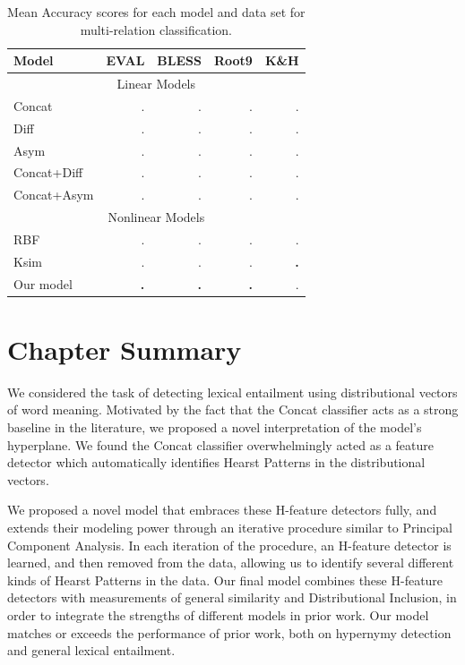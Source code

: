 \begin{table}
\centering
\begin{tabular}{|l|rrrr|}
  \hline
  {\bf Model}      & {\bf EVAL}  & {\bf BLESS} & {\bf Root9} & {\bf K\&H}  \\
  \hline
  \hline
  \multicolumn{5}{|c|}{Linear Models}\\
  \hline
  Concat           &      .      &      .      &      .        &      .      \\
  Diff             &      .      &      .      &      .        &      .      \\
  Asym             &      .      &      .      &      .        &      .      \\
  Concat+Diff      &      .      &      .      &      .        &      .      \\
  Concat+Asym      &      .      &      .      &      .        &      .      \\
  \hline
  \multicolumn{5}{|c|}{Nonlinear Models}\\
  \hline
  RBF              &      .      &      .      &      .        &      .      \\
  Ksim             &      .      &      .      &      .        &  {\bf.   }  \\
  Our model        &  {\bf.   }  &  {\bf.   }  &  {\bf.   }    &      .      \\
  \hline
\end{tabular}
\caption{Mean Accuracy scores for each model and data set for multi-relation classification.}
\label{tab:multiresults}
\end{table}



\section{Chapter Summary}

We considered the task of detecting lexical entailment using distributional
vectors of word meaning.  Motivated by the fact that the Concat classifier acts
as a strong baseline in the literature, we proposed a novel interpretation of
the model's hyperplane. We found the Concat classifier overwhelmingly acted as
a feature detector which automatically identifies Hearst Patterns in the
distributional vectors.

We proposed a novel model that embraces these H-feature detectors fully, and
extends their modeling power through an iterative procedure similar to
Principal Component Analysis. In each iteration of the procedure, an H-feature
detector is learned, and then removed from the data, allowing us to identify
several different kinds of Hearst Patterns in the data. Our final model
combines these H-feature detectors with measurements of general similarity and
Distributional Inclusion, in order to integrate the strengths of different
models in prior work. Our model matches or exceeds the performance of prior
work, both on hypernymy detection and general lexical entailment.



